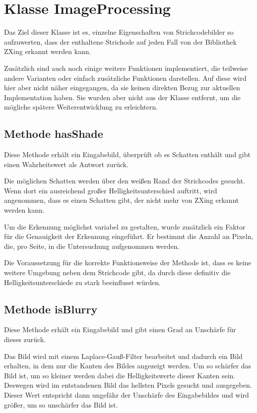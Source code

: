 \writtenby{\dcauthornameriren}%
\section{Klasse ImageProcessing}
Das Ziel dieser Klasse ist es, einzelne Eigenschaften von Strichcodebilder so aufzuwerten, dass der enthaltene Strichode auf jeden Fall von der Bibliothek ZXing erkannt werden kann.

Zusätzlich sind auch noch einige weitere Funktionen implementiert, die teilweise andere Varianten oder einfach zusätzliche Funktionen darstellen. Auf diese wird hier aber nicht näher eingegangen, da sie keinen direkten Bezug zur aktuellen Implementation haben. Sie wurden aber nicht aus der Klasse entfernt, um die mögliche spätere Weiterentwicklung zu erleichtern.


\subsection*{Methode hasShade}
Diese Methode erhält ein Eingabebild, überprüft ob es Schatten enthält und gibt einen Wahrheitswert als Antwort zurück.

Die möglichen Schatten werden über den weißen Rand der Strichcodes gesucht. Wenn dort ein ausreichend großer Helligkeitsunterschied auftritt, wird angenommen, dass es einen Schatten gibt, der nicht mehr von ZXing erkannt werden kann.

Um die Erkennung möglichst variabel zu gestalten, wurde zusätzlich ein Faktor für die Genauigkeit der Erkennung eingeführt. Er bestimmt die Anzahl an Pixeln, die, pro Seite, in die Untersuchung aufgenommen werden.

Die Voraussetzung für die korrekte Funktionsweise der Methode ist, dass es keine weitere Umgebung neben dem Strichcode gibt, da durch diese definitiv die Helligkeitsunterschiede zu stark beeinflusst würden.


\subsection*{Methode isBlurry}
Diese Methode erhält ein Eingabebild und gibt einen Grad an Unschärfe für dieses zurück.

Das Bild wird mit einem Laplace-Gauß-Filter bearbeitet und dadurch ein Bild erhalten, in dem nur die Kanten des Bildes angezeigt werden. Um so schärfer das Bild ist, um so kleiner werden dabei die Helligkeitswerte dieser Kanten sein. Deswegen wird im entstandenen Bild das hellsten Pixels gesucht und ausgegeben. Dieser Wert entspricht dann ungefähr der Unschärfe des Eingabebildes und wird größer, um so unschärfer das Bild ist.

